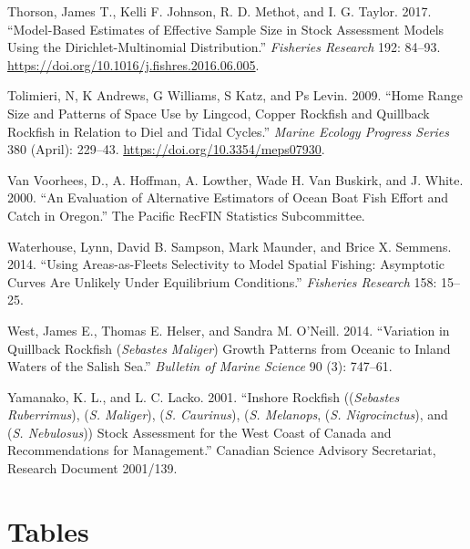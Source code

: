 \documentclass[11pt,
  english,
  a4paper,
]{article}
\begin{document}
\leavevmode\hypertarget{ref-thorson_model-based_2017}{}%
Thorson, James T., Kelli F. Johnson, R. D. Methot, and I. G. Taylor. 2017. ``Model-Based Estimates of Effective Sample Size in Stock Assessment Models Using the Dirichlet-Multinomial Distribution.'' \emph{Fisheries Research} 192: 84--93. \url{https://doi.org/10.1016/j.fishres.2016.06.005}.

\leavevmode\hypertarget{ref-tolimieri_home_2009}{}%
Tolimieri, N, K Andrews, G Williams, S Katz, and Ps Levin. 2009. ``Home Range Size and Patterns of Space Use by Lingcod, Copper Rockfish and Quillback Rockfish in Relation to Diel and Tidal Cycles.'' \emph{Marine Ecology Progress Series} 380 (April): 229--43. \url{https://doi.org/10.3354/meps07930}.

\leavevmode\hypertarget{ref-van_voorhees_evaluation_2000}{}%
Van Voorhees, D., A. Hoffman, A. Lowther, Wade H. Van Buskirk, and J. White. 2000. ``An Evaluation of Alternative Estimators of Ocean Boat Fish Effort and Catch in Oregon.'' The Pacific RecFIN Statistics Subcommittee.

\leavevmode\hypertarget{ref-Waterhouseetal_spatialSelex_2014}{}%
Waterhouse, Lynn, David B. Sampson, Mark Maunder, and Brice X. Semmens. 2014. ``Using Areas-as-Fleets Selectivity to Model Spatial Fishing: Asymptotic Curves Are Unlikely Under Equilibrium Conditions.'' \emph{Fisheries Research} 158: 15--25.

\leavevmode\hypertarget{ref-Westetal_2014}{}%
West, James E., Thomas E. Helser, and Sandra M. O'Neill. 2014. ``Variation in Quillback Rockfish (\emph{Sebastes Maliger}) Growth Patterns from Oceanic to Inland Waters of the Salish Sea.'' \emph{Bulletin of Marine Science} 90 (3): 747--61.

\leavevmode\hypertarget{ref-YamanakaandLacko_rockfish_2001}{}%
Yamanako, K. L., and L. C. Lacko. 2001. ``Inshore Rockfish ((\emph{Sebastes Ruberrimus}), (\emph{S. Maliger}), (\emph{S. Caurinus}), (\emph{S. Melanops}, (\emph{S. Nigrocinctus}), and (\emph{S. Nebulosus})) Stock Assessment for the West Coast of Canada and Recommendations for Management.'' Canadian Science Advisory Secretariat, Research Document 2001/139.

\leavevmode\tagmcend\tagstructend

\clearpage


\hypertarget{tables}{%
\section{Tables}\label{tables}}
\end{document}
